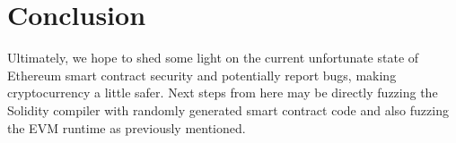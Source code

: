 \section{Conclusion}
Ultimately, we hope to shed some light on the current unfortunate state of Ethereum smart contract security and potentially report bugs, making cryptocurrency a little safer.
Next steps from here may be directly fuzzing the Solidity compiler with randomly generated smart contract code and also fuzzing the EVM runtime as previously mentioned.








